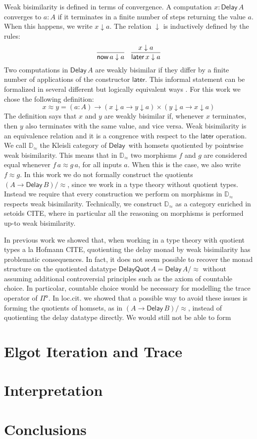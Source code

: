 \documentclass[runningheads]{llncs}
\newcommand{\Pio}{$\Pi^{\mathsf{o}}$}
\newcommand{\Delay}{\mathsf{Delay}\,}
\newcommand{\now}{\mathsf{now}}
\newcommand{\later}{\mathsf{later}}
\newcommand{\dn}{\downarrow}
\newcommand{\Dapprox}{\mathbb{D}_{\approx}}
\begin{document}
Weak bisimilarity is defined in terms of convergence. A computation
$x : \Delay A$ converges to $a : A$ if it terminates in a finite
number of steps returning the value $a$. When this happens, we write
$x \dn a$. The relation $\dn$ is inductively defined by the rules:
\[
\infer{\now\,a \dn a}{}
\quad
\infer{\later\,x \dn a}{x \dn a}
\]
Two computations in $\Delay A$ are weakly bisimilar if they differ by
a finite number of applications of the constructor $\later$. This
informal statement can be formalized in several different but
logically equivalent ways \cite{ChapmanUV19}. For this work we chose the
following definition:
\[
x \approx y = (a : A) \to (x \dn a \to y \dn a) \times (y \dn a \to x \dn a) 
\]
The definition says that $x$ and $y$ are weakly bisimilar if, whenever
$x$ terminates, then $y$ also terminates with the same value, and vice
versa. Weak bisimilarity is an equivalence relation and it is a
congrence with respect to the $\later$ operation.  We call $\Dapprox$
the Kleisli category of $\Delay$ with homsets quotiented by pointwise
weak bisimilarity. This means that in $\Dapprox$ two morphisms $f$ and
$g$ are considered equal whenever $f \, a \approx g \, a$, for all
inputs $a$. When this is the case, we also write $f \approx g$.  In
this work we do not formally construct the quotients
$(A \to \Delay B)/{\approx}$, since we work in a type theory without
quotient types. Instead we require that every construction we perform
on morphisms in $\Dapprox$ respects weak bisimilarity. Technically, we
construct $\Dapprox$ as a category enriched in setoids CITE, where in
particular all the reasoning on morphisms is performed up-to weak
bisimilarity.

In previous work \cite{ChapmanUV19} we showed that, when working in a
type theory with quotient types a la Hofmann CITE, quotienting the
delay monad by weak bisimilarity has problematic consequences. In
fact, it does not seem possible to recover the monad structure on the
quotiented datatype $\mathsf{DelayQuot}\,A = \Delay A/{\approx}$
without assuming additional controversial principles
such as the axiom of countable choice. In particolar, countable choice
would be necessary for modelling the trace operator of \Pio. In
loc.cit. we showed that a possible way to avoid these issues is
forming the quotients of homsets, as in $(A \to \Delay B)/{\approx}$, instead of
quotienting the delay datatype directly. We would still not be able to form




\section{Elgot Iteration and Trace}\label{sec:elgot}

\section{Interpretation}\label{sec:interpretation}

\section{Conclusions}


%
%
%
%
%
%


\end{document}
